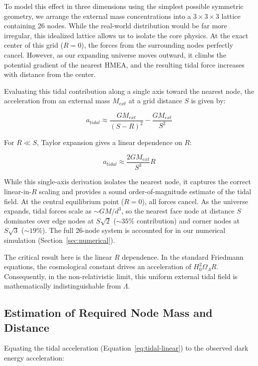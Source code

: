 \documentclass{article}
\begin{document}
To model this effect in three dimensions using the simplest possible symmetric geometry, we arrange the external mass concentrations into a $3\times3\times3$ lattice containing 26 nodes. While the real-world distribution would be far more irregular, this idealized lattice allows us to isolate the core physics. At the exact center of this grid ($R=0$), the forces from the surrounding nodes perfectly cancel. However, as our expanding universe moves outward, it climbs the potential gradient of the nearest HMEA, and the resulting tidal force increases with distance from the center.

Evaluating this tidal contribution along a single axis toward the nearest node, the acceleration from an external mass $M_{ext}$ at a grid distance $S$ is given by:

\begin{equation}
a_{tidal} \approx \frac{G M_{ext}}{(S - R)^2} - \frac{G M_{ext}}{S^2}
\label{eq:tidal-exact}
\end{equation}

For $R \ll S$, Taylor expansion gives a linear dependence on $R$:

\begin{equation}
a_{tidal} \approx \frac{2 G M_{ext}}{S^3} R
\label{eq:tidal-linear}
\end{equation}

While this single-axis derivation isolates the nearest node, it captures the correct linear-in-$R$ scaling and provides a sound order-of-magnitude estimate of the tidal field. At the central equilibrium point ($R = 0$), all forces cancel. As the universe expands, tidal forces scale as $\sim G M / d^3$, so the nearest face node at distance $S$ dominates over edge nodes at $S\sqrt{2}$ ($\sim 35\%$ contribution) and corner nodes at $S\sqrt{3}$ ($\sim 19\%$). The full 26-node system is accounted for in our numerical simulation (Section~\ref{sec:numerical}).

The critical result here is the linear $R$ dependence. In the standard Friedmann equations, the cosmological constant drives an acceleration of $H_0^2 \Omega_\Lambda R$. Consequently, in the non-relativistic limit, this uniform external tidal field is mathematically indistinguishable from $\Lambda$.

\subsection{Estimation of Required Node Mass and Distance}
\label{sec:estimation}
Equating the tidal acceleration (Equation~\ref{eq:tidal-linear}) to the observed dark energy acceleration:
\end{document}
